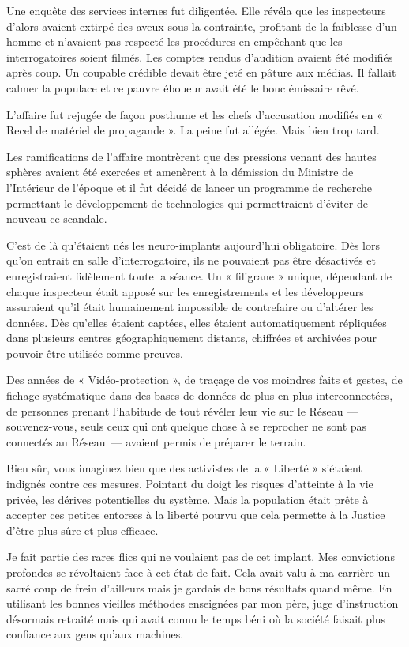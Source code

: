 Une enquête des services internes fut diligentée. Elle révéla que les inspecteurs d'alors avaient extirpé des aveux
sous la contrainte, profitant de la faiblesse d'un homme et n'avaient pas respecté les procédures en empêchant que les
interrogatoires soient filmés. Les comptes rendus d'audition avaient été modifiés après coup. Un coupable crédible
devait être jeté en pâture aux médias. Il fallait calmer la populace et ce pauvre éboueur avait été le bouc émissaire
rêvé. 

L'affaire fut rejugée de façon posthume et les chefs d'accusation modifiés en « Recel de matériel de propagande ». La
peine fut allégée. Mais bien trop tard.

Les ramifications de l'affaire montrèrent que des pressions venant des hautes sphères avaient été exercées et amenèrent
à la démission du Ministre de l'Intérieur de l'époque et il fut décidé de lancer un programme de recherche permettant le
développement de technologies qui permettraient d'éviter de nouveau ce scandale.

C'est de là qu'étaient nés les neuro-implants aujourd'hui obligatoire. Dès lors qu'on entrait en salle d'interrogatoire,
ils ne pouvaient pas être désactivés et enregistraient fidèlement toute la séance. Un « filigrane » unique, dépendant de
chaque inspecteur était apposé sur les enregistrements et les développeurs assuraient qu'il était humainement impossible
de contrefaire ou d'altérer les données. Dès qu'elles étaient captées, elles étaient automatiquement répliquées dans
plusieurs centres géographiquement distants, chiffrées et archivées pour pouvoir être utilisée comme preuves.

Des années de « Vidéo-protection », de traçage de vos moindres faits et gestes, de fichage systématique dans des bases
de données de plus en plus interconnectées, de personnes prenant l'habitude de tout révéler leur vie sur le Réseau —
souvenez-vous, seuls ceux qui ont quelque chose à se reprocher ne sont pas connectés au Réseau — avaient permis de
préparer le terrain.

Bien sûr, vous imaginez bien que des activistes de la « Liberté » s'étaient indignés contre ces mesures. Pointant du
doigt les risques d'atteinte à la vie privée, les dérives potentielles du système. Mais la population était prête à
accepter ces petites entorses à la liberté pourvu que cela permette à la Justice d'être plus sûre et plus efficace.

Je fait partie des rares flics qui ne voulaient pas de cet implant. Mes convictions profondes se révoltaient face à cet
état de fait. Cela avait valu à ma carrière un sacré coup de frein d'ailleurs mais je gardais de bons résultats quand
même. En utilisant les bonnes vieilles méthodes enseignées par mon père, juge d'instruction désormais retraité mais qui
avait connu le temps béni où la société faisait plus confiance aux gens qu'aux machines.

